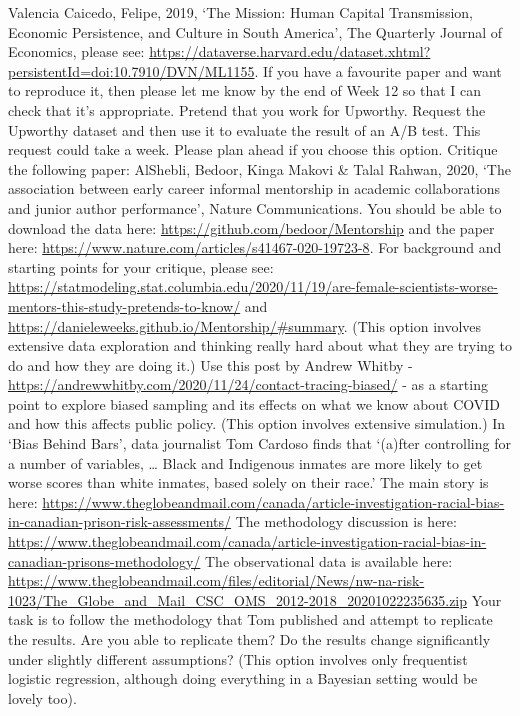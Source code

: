 \documentclass[
]{book}
\begin{document}
Valencia Caicedo, Felipe, 2019, `The Mission: Human Capital Transmission, Economic Persistence, and Culture in South America', The Quarterly Journal of Economics, please see: \url{https://dataverse.harvard.edu/dataset.xhtml?persistentId=doi:10.7910/DVN/ML1155}.
If you have a favourite paper and want to reproduce it, then please let me know by the end of Week 12 so that I can check that it's appropriate.
Pretend that you work for Upworthy. Request the Upworthy dataset and then use it to evaluate the result of an A/B test. This request could take a week. Please plan ahead if you choose this option.
Critique the following paper: AlShebli, Bedoor, Kinga Makovi \& Talal Rahwan, 2020, `The association between early career informal mentorship in academic collaborations and junior author performance', Nature Communications. You should be able to download the data here: \url{https://github.com/bedoor/Mentorship} and the paper here: \url{https://www.nature.com/articles/s41467-020-19723-8}. For background and starting points for your critique, please see: \url{https://statmodeling.stat.columbia.edu/2020/11/19/are-female-scientists-worse-mentors-this-study-pretends-to-know/} and \url{https://danieleweeks.github.io/Mentorship/\#summary}. (This option involves extensive data exploration and thinking really hard about what they are trying to do and how they are doing it.)
Use this post by Andrew Whitby - \url{https://andrewwhitby.com/2020/11/24/contact-tracing-biased/} - as a starting point to explore biased sampling and its effects on what we know about COVID and how this affects public policy. (This option involves extensive simulation.)
In `Bias Behind Bars', data journalist Tom Cardoso finds that `(a)fter controlling for a number of variables, \ldots{} Black and Indigenous inmates are more likely to get worse scores than white inmates, based solely on their race.'
The main story is here: \url{https://www.theglobeandmail.com/canada/article-investigation-racial-bias-in-canadian-prison-risk-assessments/}
The methodology discussion is here: \url{https://www.theglobeandmail.com/canada/article-investigation-racial-bias-in-canadian-prisons-methodology/}
The observational data is available here: \url{https://www.theglobeandmail.com/files/editorial/News/nw-na-risk-1023/The_Globe_and_Mail_CSC_OMS_2012-2018_20201022235635.zip}
Your task is to follow the methodology that Tom published and attempt to replicate the results. Are you able to replicate them? Do the results change significantly under slightly different assumptions? (This option involves only frequentist logistic regression, although doing everything in a Bayesian setting would be lovely too).
\end{document}
